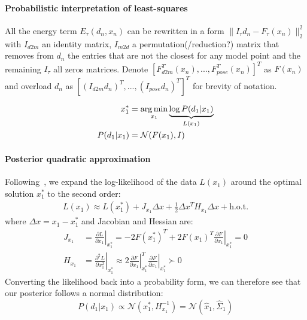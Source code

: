 \paragraph{Probabilistic interpretation of least-squares}
\begin{DRAFT}
All the energy term $E_{\tau}(d_n, x_n)$ can be rewritten in a form $\|I_{\tau} d_n - F_{\tau} (x_n)\|_2^2$ with $I_{d2m}$ an identity matrix, $I_{m2d}$ a permutation(/reduction?) matrix that removes from $d_n$ the entries that are not the closest for any model point and the remaining $I_{\tau}$ all zeros matrices. 
Denote $\left[F_{d2m}^T(x_n), ..., F_{pose}^T(x_n)\right]^T$ as $F(x_n)$ and overload $d_n$ as  $\left[(I_{d2m} d_n)^T, ..., (I_{pose} d_n)^T\right]^T$  for brevity of notation.
\end{DRAFT}
% 
\begin{align}
x^*_1 &= \operatorname*{arg\,min}_{x_1} \underbrace{\log  P(d_1|x_1)}_{L(x_1)} 
\\
P(d_1|x_1) &= \mathcal{N}(F(x_1), I) 
\label{eq:independent}
\end{align}
% 

\paragraph{Posterior quadratic approximation} 
\label{sec:posterior}
% 
Following~\todo{[??]}, we expand the log-likelihood of the data $L(x_1)$ around the optimal solution $x_1^*$ to the second order:
% 
\begin{align}
L(x_1) \approx L(x_1^*)   
+ J_{x_1} \Delta x
+ \tfrac{1}{2} \Delta x^T H_{x_1} \Delta x 
+ \text{h.o.t.}
\end{align}
%
where $\Delta x=x_1 - x_1^*$ and Jacobian and Hessian are:
\begin{align*}
J_{x_1} &= 
\left.\tfrac{\partial L}{\partial x_1} \right|_{x_1^*} = - 2 F(x_1^*)^T + 2 F(x_1)^T 
\left.\tfrac{\partial F}{\partial x_1}\right|_{x_1^*} = 0
\\
H_{x_1} &= 
\left.\tfrac{\partial^2 L}{\partial x_1^2}\right|_{x_1^*} 
\approx 2
\left.\tfrac{\partial F}{\partial x_1}\right|_{x_1^*}^T  
\left.\tfrac{\partial F}{\partial x_1}\right|_{x_1^*}
\succ 0
\end{align*}
% 
Converting the likelihood back into a probability form, we can therefore see that our posterior follows a normal distribution:
% 
\begin{equation}
P(d_1|x_1) 
\propto \mathcal{N}(x_1^*, H_{x_1}^{-1}) 
= \mathcal{N}(\hat x_1, \hat \Sigma_1)
\end{equation}

